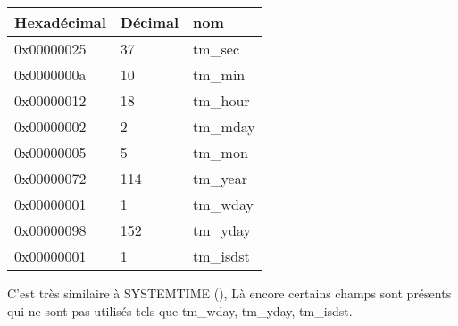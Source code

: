 \begin{center}
\begin{tabular}{ | l | l | l | }
\hline
\headercolor{} Hexadécimal & 
\headercolor{} Décimal & 
\headercolor{} nom \\
\hline
0x00000025 & 37 	& tm\_sec \\
\hline
0x0000000a & 10 	& tm\_min \\
\hline
0x00000012 & 18 	& tm\_hour \\	
\hline
0x00000002 & 2 		& tm\_mday \\	
\hline
0x00000005 & 5 		& tm\_mon \\	
\hline
0x00000072 & 114 	& tm\_year \\
\hline
0x00000001 & 1 		& tm\_wday \\	
\hline
0x00000098 & 152 	& tm\_yday \\	
\hline
0x00000001 & 1 		& tm\_isdst \\
\hline
\end{tabular}
\end{center}

C'est très similaire à SYSTEMTIME (),
Là encore certains champs sont présents qui ne sont pas utilisés tels que tm\_wday, tm\_yday,
tm\_isdst.
